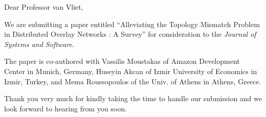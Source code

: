 \documentclass[11pt]{article}
\begin{document}


\begin{letter}{Dear Professor van Vliet,}

\baselineskip

We are submitting a paper entitled 
``Alleviating the Topology Mismatch Problem in Distributed Overlay Networks
: A Survey''
for consideration 
to the {\it Journal of Systems and Software}.

The paper is co-authored with Vassilis Moustakas 
of Amazon Development Center in Munich, Germany, 
Huseyin Akcan of Izmir University of Economics in 
Izmir, Turkey,  and 
Mema Roussopoulos of the Univ. of Athens in Athens, Greece.

Thank you very much for kindly taking the time to handle our submission and
we look forward to hearing from you soon.


\end{letter}
\end{document}
